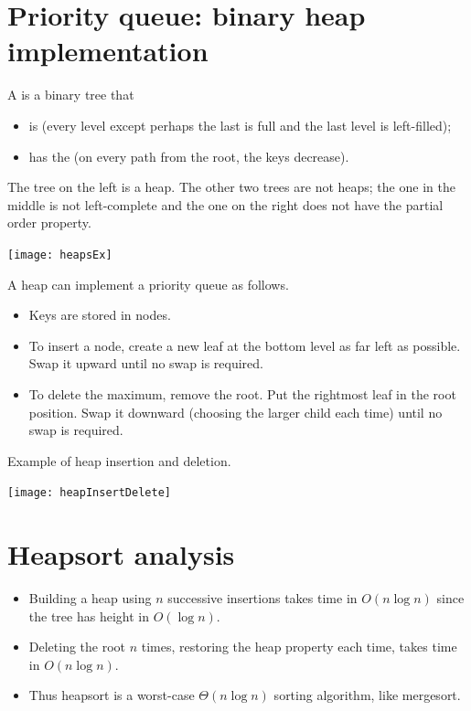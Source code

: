 \section{Priority queue: binary heap implementation}
\begin{Definition}
A  is a binary tree that 
\begin{itemize}
\item is  (every level except perhaps the last is full and 
the last level is left-filled);
\item has the  (on every path from the root, the keys decrease). 
\end{itemize}
\end{Definition}

\begin{Boxample}
The tree on the left is a heap. The other two trees are not heaps; 
the one in the middle is not left-complete and the one on the right does not have the partial order property.
\begin{center}
\texttt{[image: heapsEx]}
\end{center}
\end{Boxample}

A heap can implement a priority queue as follows. 
\begin{itemize}
\item Keys are stored in nodes. 
\item To insert a node, create a new leaf at the bottom level as far left as 
possible. Swap it upward until no swap is required. 
\item To delete the maximum, remove the root. Put the rightmost leaf in the root
 position. Swap it downward (choosing the larger child each time) until no swap 
is required. 
\end{itemize}

\begin{Boxample}
Example of heap insertion and deletion. 
\begin{center}
\texttt{[image: heapInsertDelete]}
\end{center}
\end{Boxample}

\section{Heapsort analysis}
\begin{itemize}
\item Building a heap using $n$ successive insertions takes time in 
$O(n\log n)$ since the tree has height in $O(\log n)$.
\item Deleting the root $n$ times, restoring the heap property each time, takes
 time in $O(n \log n)$.
\item Thus heapsort is a worst-case $\Theta(n \log n)$ sorting algorithm, like 
mergesort. 
\end{itemize}

